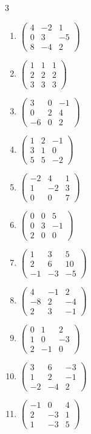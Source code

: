 \begin{multicols}{3}
\begin{enumerate}[label=\arabic*.,  leftmargin=*]
\item $\begin{pmatrix}4&-2&1\\0&3&-5\\8&-4&2\end{pmatrix}$
\item $\begin{pmatrix}1&1&1\\2&2&2\\3&3&3\end{pmatrix}$
\item $\begin{pmatrix}3&0&-1\\0&2&4\\-6&0&2\end{pmatrix}$
\item $\begin{pmatrix}1&2&-1\\3&1&0\\5&5&-2\end{pmatrix}$
\item $\begin{pmatrix}-2&4&1\\1&-2&3\\0&0&7\end{pmatrix}$
\item $\begin{pmatrix}0&0&5\\0&3&-1\\2&0&0\end{pmatrix}$
\item $\begin{pmatrix}1&3&5\\2&6&10\\-1&-3&-5\end{pmatrix}$
\item $\begin{pmatrix}4&-1&2\\-8&2&-4\\2&3&-1\end{pmatrix}$
\item $\begin{pmatrix}0&1&2\\1&0&-3\\2&-1&0\end{pmatrix}$
\item $\begin{pmatrix}3&6&-3\\1&2&-1\\-2&-4&2\end{pmatrix}$
\item $\begin{pmatrix}-1&0&4\\2&-3&1\\1&-3&5\end{pmatrix}$

\end{enumerate}
\end{multicols}
